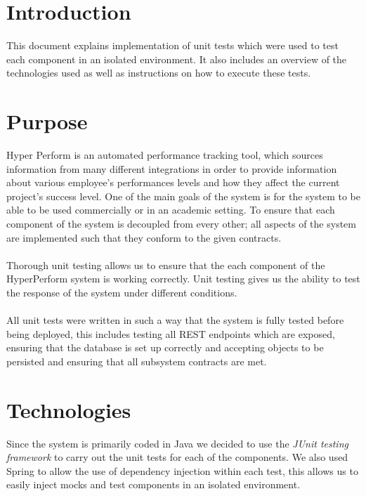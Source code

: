 \documentclass[11pt,a4paper]{article}
\begin{document}
	\thispagestyle{empty}
	\pagebreak
	
	\tableofcontents
	\pagebreak

\section{Introduction}

This document explains implementation of unit tests which were used to test each component in an isolated environment. It also includes an overview of the technologies used as well as instructions on how to execute these tests. \\ 

\section{Purpose}
Hyper Perform is an automated performance tracking tool, which sources information from many different integrations in order to provide information about various employee's performances levels and how they affect the current project's success level. One of the main goals of the system is for the system to be able to be used commercially or in an academic setting. To ensure that each component of the system is decoupled from every other; all aspects of the system are implemented such that they conform to the given contracts. \\ \\
Thorough unit testing allows us to ensure that the each component of the HyperPerform system is working correctly. Unit testing gives us the ability to test the response of the system under different conditions. \\ \\
All unit tests were written in such a way that the system is fully tested before being deployed, this includes testing all REST endpoints which are exposed, ensuring that the database is set up correctly and accepting objects to be persisted and ensuring that all subsystem contracts are met.

\section{Technologies}

Since the system is primarily coded in Java we decided to use the \textit{JUnit testing framework} to carry out the unit tests for each of the components. We also used Spring to allow the use of dependency injection within each test, this allows us to easily inject mocks and test components in an isolated environment. \\
\end{document}
